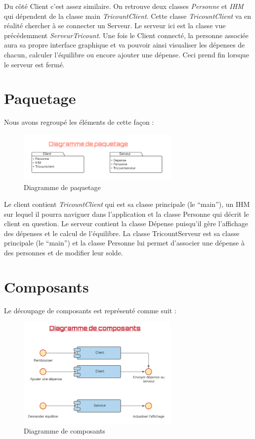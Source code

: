 \documentclass[12,french]{report}
\begin{document}
Du côté Client c’est assez similaire. On retrouve deux classes \textit{Personne} et \textit{IHM} qui dépendent de la classe main \textit{TricountClient}. Cette classe \textit{TricountClient} va en réalité chercher à se connecter un Serveur. Le serveur ici est la classe vue précédemment \textit{ServeurTricount}. Une fois le Client connecté, la personne associée aura sa propre interface graphique et va pouvoir ainsi visualiser les dépenses de chacun, calculer l’équilibre ou encore ajouter une dépense. Ceci prend fin lorsque le serveur est fermé.

\section{Paquetage}

Nous avons regroupé les éléments de cette façon : \\

\begin{figure}[H]
	\center
	\includegraphics[width=0.7\textwidth]{./Images/Paquetage}
	\caption{Diagramme de paquetage}
\end{figure}\vspace{0.2cm}

Le client contient \textit{TricountClient} qui est sa classe principale (le “main”), un IHM sur lequel il pourra naviguer dans l’application et la classe Personne qui décrit le client en question. 
Le serveur contient la classe Dépense puisqu’il gère l’affichage des dépenses et le calcul de l’équilibre. La classe TricountServeur est sa classe principale (le “main”) et la classe Personne lui permet d’associer une dépense à des personnes et de modifier leur solde.

\section{Composants}

Le découpage de composants est représenté comme suit :\\

\begin{figure}[H]
	\center
	\includegraphics[width=0.7\textwidth]{./Images/Composants}
	\caption{Diagramme de composants}
\end{figure}\vspace{0.2cm}
\end{document}
